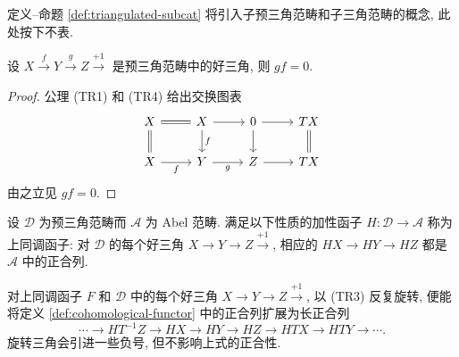 定义--命题 \ref{def:triangulated-subcat} 将引入子预三角范畴和子三角范畴的概念, 此处按下不表.

\begin{lemma}\label{prop:dt-composite-null}
	设 $X \xrightarrow{f} Y \xrightarrow{g} Z \xrightarrow{+1}$ 是预三角范畴中的好三角, 则 $gf=0$.
\end{lemma}
\begin{proof}
	公理 (TR1) 和 (TR4) 给出交换图表
	\[\begin{tikzcd}
		X \arrow[equal, d] \arrow[equal, r] & X \arrow[r] \arrow[d, "f"] & 0 \arrow[d] \arrow[r] & TX \arrow[equal, d] \\
		X \arrow[r, "f"'] & Y \arrow[r, "g"'] & Z \arrow[r] & TX
	\end{tikzcd}\]
	由之立见 $gf=0$.
\end{proof}

\begin{definition}[上同调函子]\label{def:cohomological-functor}
	设 $\mathcal{D}$ 为预三角范畴而 $\mathcal{A}$ 为 Abel 范畴. 满足以下性质的加性函子 $H: \mathcal{D} \to \mathcal{A}$ 称为上同调函子: 对 $\mathcal{D}$ 的每个好三角 $X \to Y \to Z \xrightarrow{+1}$, 相应的 $HX \to HY \to HZ$ 都是 $\mathcal{A}$ 中的正合列.
\end{definition}

\begin{remark}[上同调函子的长正合列]\label{rem:cohomological-functor-long}
	对上同调函子 $F$ 和 $\mathcal{D}$ 中的每个好三角 $X \to Y \to Z \xrightarrow{+1}$, 以 (TR3) 反复旋转, 便能将定义 \ref{def:cohomological-functor} 中的正合列扩展为长正合列
	\[ \cdots \to HT^{-1}Z \to HX \to HY \to HZ \to HTX \to HTY \to \cdots . \]
	旋转三角会引进一些负号, 但不影响上式的正合性.
\end{remark}

